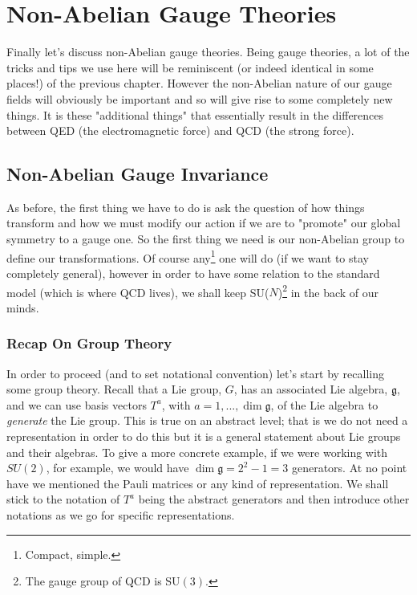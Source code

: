 \chapter{Non-Abelian Gauge Theories}


Finally let's discuss non-Abelian gauge theories. Being gauge theories, a lot of the tricks and tips we use here will be reminiscent (or indeed identical in some places!) of the previous chapter. However the non-Abelian nature of our gauge fields will obviously be important and so will give rise to some completely new things. It is these "additional things" that essentially result in the differences between QED (the electromagnetic force) and QCD (the strong force). 

\section{Non-Abelian Gauge Invariance}

As before, the first thing we have to do is ask the question of how things transform and how we must modify our action if we are to "promote" our global symmetry to a gauge one. So the first thing we need is our non-Abelian group to define our transformations. Of course any\footnote{Compact, simple.} one will do (if we want to stay completely general), however in order to have some relation to the standard model (which is where QCD lives), we shall keep SU($N$)\footnote{The gauge group of QCD is SU$(3)$.} in the back of our minds. 

\subsection{Recap On Group Theory}

In order to proceed (and to set notational convention) let's start by recalling some group theory. Recall that a Lie group, $G$, has an associated Lie algebra, $\mathfrak{g}$, and we can use basis vectors $T^a$, with $a=1,...,\dim\mathfrak{g}$, of the Lie algebra to \textit{generate} the Lie group. This is true on an abstract level; that is we do not need a representation in order to do this but it is a general statement about Lie groups and their algebras. To give a more concrete example, if we were working with $SU(2)$, for example, we would have $\dim\mathfrak{g}= 2^2 -1 = 3$ generators. At no point have we mentioned the Pauli matrices or any kind of representation. We shall stick to the notation of $T^a$ being the abstract generators and then introduce other notations as we go for specific representations. 

